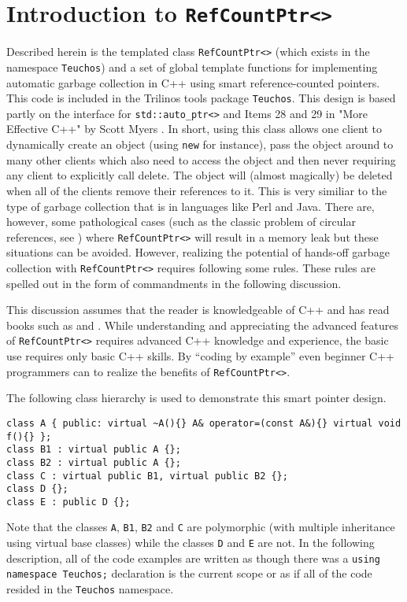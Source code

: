 %
\section{Introduction to {}\texttt{RefCountPtr<>}}
\label{rcp:sec:intro}
%

Described herein is the templated class {}\texttt{RefCountPtr<>}
(which exists in the namespace {}\texttt{Teuchos}) and a set of global
template functions for implementing automatic garbage collection in
C++ using smart reference-counted pointers.  This code is included in
the Trilinos {}\cite{ref:Trilinos-Overview} tools package
{}\texttt{Teuchos}.  This design is based partly on the interface for
{}\texttt{std::auto\_ptr<>} and Items 28 and 29 in "More Effective
C++" by Scott Myers {}\cite{ref:meyers_1996}.  In short, using this
class allows one client to dynamically create an object (using
{}\texttt{new} for instance), pass the object around to many other
clients which also need to access the object and then never requiring
any client to explicitly call delete.  The object will (almost
magically) be deleted when all of the clients remove their references
to it.  This is very similiar to the type of garbage collection that
is in languages like Perl and Java.  There are, however, some
pathological cases (such as the classic problem of circular
references, see {}\cite[Item 29, page 212]{ref:meyers_1996}) where
{}\texttt{RefCountPtr<>} will result in a memory leak but these
situations can be avoided.  However, realizing the potential of
hands-off garbage collection with {}\texttt{RefCountPtr<>} requires
following some rules.  These rules are spelled out in the form of
commandments in the following discussion.

This discussion assumes that the reader is knowledgeable of C++ and
has read books such as {}\cite{ref:stroustrup_2000} and
{}\cite{ref:meyers_1994}.  While understanding and appreciating the
advanced features of {}\texttt{RefCountPtr<>} requires advanced C++
knowledge and experience, the basic use requires only basic C++
skills.  By ``coding by example'' even beginner C++ programmers can to
realize the benefits of {}\texttt{RefCountPtr<>}.

The following class hierarchy is used to demonstrate this smart
pointer design.

{\scriptsize\begin{verbatim}
class A { public: virtual ~A(){} A& operator=(const A&){} virtual void f(){} };
class B1 : virtual public A {};
class B2 : virtual public A {};
class C : virtual public B1, virtual public B2 {};
class D {};
class E : public D {};
\end{verbatim}

}Note that the classes {}\texttt{A}, {}\texttt{B1}, {}\texttt{B2} and
{}\texttt{C} are polymorphic (with multiple inheritance using virtual
base classes) while the classes {}\texttt{D} and {}\texttt{E} are not.
In the following description, all of the code examples are written as
though there was a {}\texttt{using namespace Teuchos;} declaration is
the current scope or as if all of the code resided in the
{}\texttt{Teuchos} namespace.

